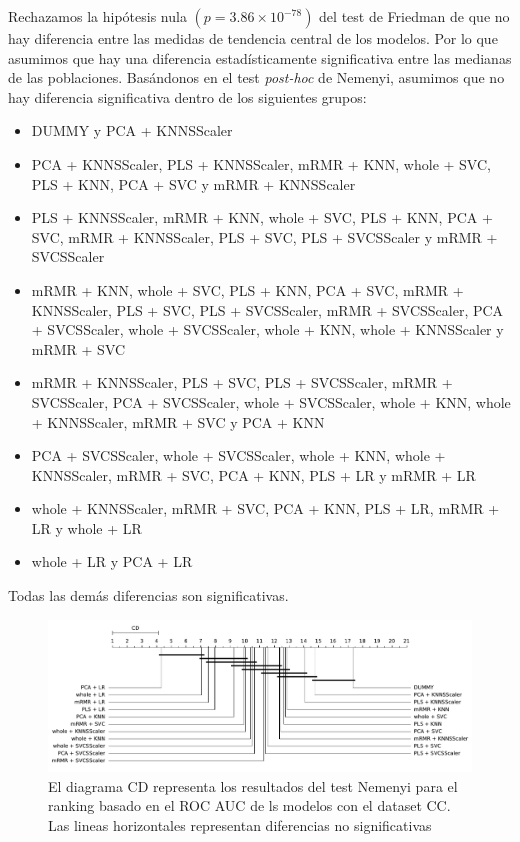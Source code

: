 \documentclass[a4paper,oneside,11pt,leqno]{article}
\begin{document}
	Rechazamos la hipótesis nula $(p=3.86\times 10^{-78})$ del test de Friedman de que no hay diferencia entre las medidas de tendencia central de los modelos. Por lo que asumimos que hay una diferencia estadísticamente significativa entre las medianas de las poblaciones.
	\clearpage
	Basándonos en el test \textit{post-hoc} de Nemenyi, asumimos que no hay diferencia significativa dentro de los siguientes grupos:
	
	\begin{itemize}
		\item DUMMY y PCA + KNNSScaler
		
		\item PCA + KNNSScaler, PLS + KNNSScaler, mRMR + KNN, whole + SVC, PLS + KNN, PCA + SVC y mRMR + KNNSScaler
		
		\item PLS + KNNSScaler, mRMR + KNN, whole + SVC, PLS + KNN, PCA + SVC, mRMR + KNNSScaler, PLS + SVC, PLS + SVCSScaler y mRMR + SVCSScaler
		
		\item mRMR + KNN, whole + SVC, PLS + KNN, PCA + SVC, mRMR + KNNSScaler, PLS + SVC, PLS + SVCSScaler, mRMR + SVCSScaler, PCA + SVCSScaler, whole + SVCSScaler, whole + KNN, whole + KNNSScaler y mRMR + SVC 
		
		\item  mRMR + KNNSScaler, PLS + SVC, PLS + SVCSScaler, mRMR + SVCSScaler, PCA + SVCSScaler, whole + SVCSScaler, whole + KNN, whole + KNNSScaler, mRMR + SVC y PCA + KNN
		
		\item  PCA + SVCSScaler, whole + SVCSScaler, whole + KNN, whole + KNNSScaler, mRMR + SVC, PCA + KNN, PLS + LR y mRMR + LR
	
		\item  whole + KNNSScaler, mRMR + SVC, PCA + KNN, PLS + LR, mRMR + LR y whole + LR
		
		\item whole + LR y PCA + LR
	\end{itemize}
	
	Todas las demás diferencias son significativas.
	
	\begin{figure}[h]
		\includegraphics[width=\linewidth]{stat_results_cc.pdf}
		\caption{El diagrama CD representa los resultados del test Nemenyi para el ranking basado en el ROC AUC de ls modelos con el dataset CC. Las lineas horizontales representan diferencias no significativas}
		\label{fig:stats_fig_cc}
	\end{figure}
\end{document}

